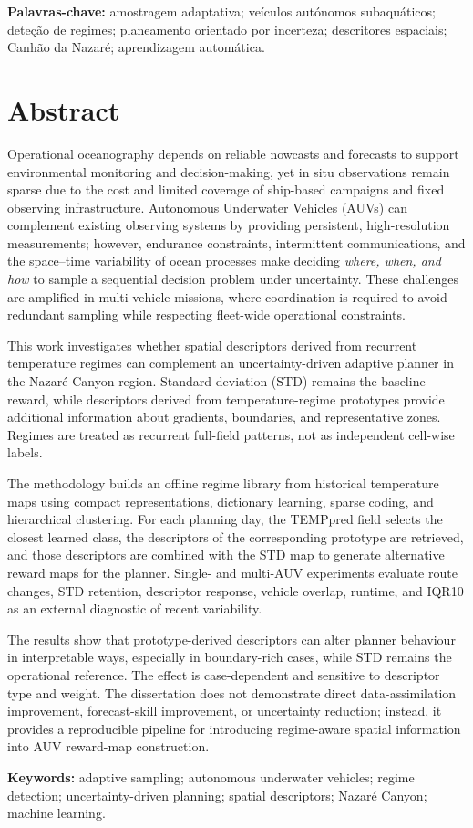 \bigskip
\noindent\textbf{Palavras-chave:} amostragem adaptativa; veículos autónomos subaquáticos; deteção de regimes; planeamento orientado por incerteza; descritores espaciais; Canhão da Nazaré; aprendizagem automática.

\chapter*{Abstract}
%
Operational oceanography depends on reliable nowcasts and forecasts to support environmental monitoring and decision-making, yet in situ observations remain sparse due to the cost and limited coverage of ship-based campaigns and fixed observing infrastructure. Autonomous Underwater Vehicles (AUVs) can complement existing observing systems by providing persistent, high-resolution measurements; however, endurance constraints, intermittent communications, and the space--time variability of ocean processes make deciding \emph{where, when, and how} to sample a sequential decision problem under uncertainty. These challenges are amplified in multi-vehicle missions, where coordination is required to avoid redundant sampling while respecting fleet-wide operational constraints.

This work investigates whether spatial descriptors derived from recurrent temperature regimes can complement an uncertainty-driven adaptive planner in the Nazaré Canyon region. Standard deviation (STD) remains the baseline reward, while descriptors derived from temperature-regime prototypes provide additional information about gradients, boundaries, and representative zones. Regimes are treated as recurrent full-field patterns, not as independent cell-wise labels.

The methodology builds an offline regime library from historical temperature maps using compact representations, dictionary learning, sparse coding, and hierarchical clustering. For each planning day, the TEMPpred field selects the closest learned class, the descriptors of the corresponding prototype are retrieved, and those descriptors are combined with the STD map to generate alternative reward maps for the planner. Single- and multi-AUV experiments evaluate route changes, STD retention, descriptor response, vehicle overlap, runtime, and IQR10 as an external diagnostic of recent variability.

The results show that prototype-derived descriptors can alter planner behaviour in interpretable ways, especially in boundary-rich cases, while STD remains the operational reference. The effect is case-dependent and sensitive to descriptor type and weight. The dissertation does not demonstrate direct data-assimilation improvement, forecast-skill improvement, or uncertainty reduction; instead, it provides a reproducible pipeline for introducing regime-aware spatial information into AUV reward-map construction.

\bigskip
\noindent\textbf{Keywords:} adaptive sampling; autonomous underwater vehicles; regime detection; uncertainty-driven planning; spatial descriptors; Nazaré Canyon; machine learning.
